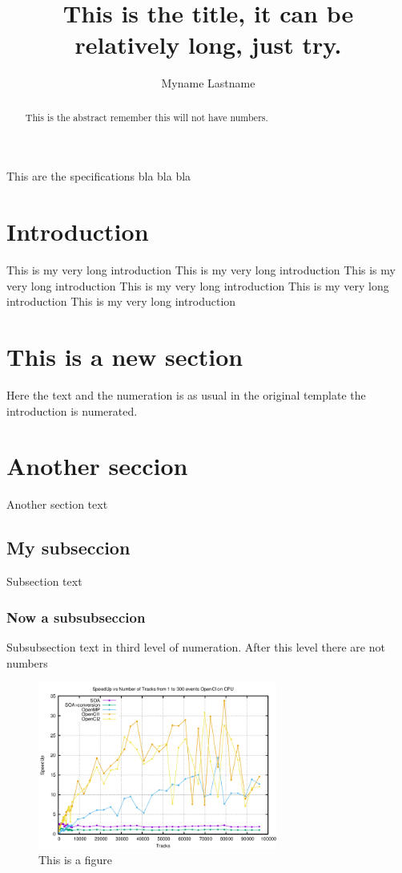\documentclass[11pt]{report}
\title{This is the title, it can be relatively long, just try.}
\author{Myname Lastname}
\begin{document}
\maketitle
\begin{specification}
	This are the specifications bla bla bla
\end{specification}

\begin{abstract}
	This is the abstract remember this will not have numbers.
\end{abstract}

\tableofcontents
\newpage

\section{Introduction}
This is my very long introduction This is my very long introduction This is my very long introduction This is my very long introduction This is my very long introduction This is my very long introduction 

\section{This is a new section}
Here the text and the numeration is as usual in the original template the introduction is numerated.

\section{Another seccion}
Another section text

\subsection{My subseccion}
Subsection text

\subsubsection{Now a subsubseccion}
Subsubsection text in third level of numeration. After this level there are not numbers

\begin{figure}[h]
	\centering
	\includegraphics[width=0.7\textwidth]{SU_OMP_Code}
	\caption{This is a figure}
\end{figure}
\end{document}
